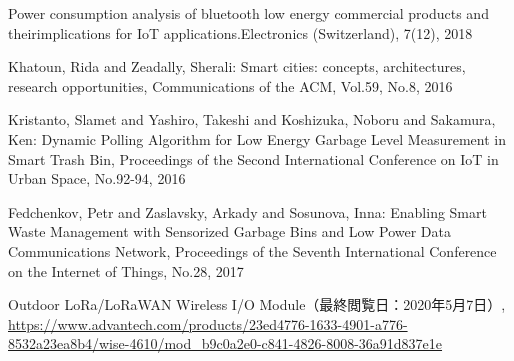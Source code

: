 \documentclass[Japanese]{dicomopapers}
\begin{document}
\begin{thebibliography}{4}
     Power consumption analysis of bluetooth low energy commercial products and theirimplications for IoT applications.Electronics (Switzerland), 7(12), 2018

     Khatoun, Rida and Zeadally, Sherali: Smart cities: concepts, architectures, research opportunities, Communications of the ACM, Vol.59, No.8, 2016

     Kristanto, Slamet and Yashiro, Takeshi and Koshizuka, Noboru and Sakamura, Ken: Dynamic Polling Algorithm for Low Energy Garbage Level Measurement in Smart Trash Bin, Proceedings of the Second International Conference on IoT in Urban Space, No.92-94, 2016

     Fedchenkov, Petr and Zaslavsky, Arkady and Sosunova, Inna: Enabling Smart Waste Management with Sensorized Garbage Bins and Low Power Data Communications Network, Proceedings of the Seventh International Conference on the Internet of Things, No.28, 2017

     Outdoor LoRa/LoRaWAN Wireless I/O Module（最終閲覧日：2020年5月7日）, \url{https://www.advantech.com/products/23ed4776-1633-4901-a776-8532a23ea8b4/wise-4610/mod_b9c0a2e0-c841-4826-8008-36a91d837e1e}

\end{thebibliography}
\end{document}
